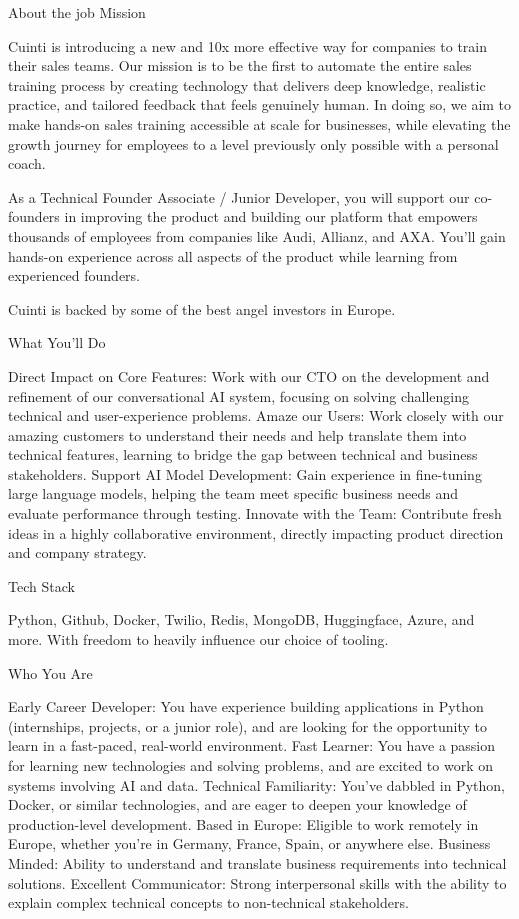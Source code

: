 About the job
Mission

Cuinti is introducing a new and 10x more effective way for companies to train their sales teams. Our mission is to be the first to automate the entire sales training process by creating technology that delivers deep knowledge, realistic practice, and tailored feedback that feels genuinely human. In doing so, we aim to make hands-on sales training accessible at scale for businesses, while elevating the growth journey for employees to a level previously only possible with a personal coach.



As a Technical Founder Associate / Junior Developer, you will support our co-founders in improving the product and building our platform that empowers thousands of employees from companies like Audi, Allianz, and AXA. You'll gain hands-on experience across all aspects of the product while learning from experienced founders.



Cuinti is backed by some of the best angel investors in Europe.



What You’ll Do

Direct Impact on Core Features: Work with our CTO on the development and refinement of our conversational AI system, focusing on solving challenging technical and user-experience problems.
Amaze our Users: Work closely with our amazing customers to understand their needs and help translate them into technical features, learning to bridge the gap between technical and business stakeholders.
Support AI Model Development: Gain experience in fine-tuning large language models, helping the team meet specific business needs and evaluate performance through testing.
Innovate with the Team: Contribute fresh ideas in a highly collaborative environment, directly impacting product direction and company strategy.


Tech Stack

Python, Github, Docker, Twilio, Redis, MongoDB, Huggingface, Azure, and more. With freedom to heavily influence our choice of tooling.



Who You Are

Early Career Developer: You have experience building applications in Python (internships, projects, or a junior role), and are looking for the opportunity to learn in a fast-paced, real-world environment.
Fast Learner: You have a passion for learning new technologies and solving problems, and are excited to work on systems involving AI and data.
Technical Familiarity: You’ve dabbled in Python, Docker, or similar technologies, and are eager to deepen your knowledge of production-level development.
Based in Europe: Eligible to work remotely in Europe, whether you're in Germany, France, Spain, or anywhere else.
Business Minded: Ability to understand and translate business requirements into technical solutions.
Excellent Communicator: Strong interpersonal skills with the ability to explain complex technical concepts to non-technical stakeholders.


